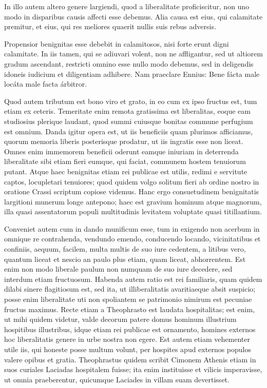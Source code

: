  In illo autem altero genere largiendi, quod a liberalitate proficiscitur, non uno modo in disparibus causis affecti esse debemus. Alia causa est eius, qui calamitate premitur, et eius, qui res meliores quaerit nullis suis rebus adversis.

 Propensior benignitas esse debebit in calamitosos, nisi forte erunt digni calamitate. In iis tamen, qui se adiuvari volent, non ne affligantur, sed ut altiorem gradum ascendant, restricti omnino esse nullo modo debemus, sed in deligendis idoneis iudicium et diligentiam adhibere. Nam praeclare Ennius: Bene fácta male locáta male facta árbitror.

 Quod autem tributum est bono viro et grato, in eo cum ex ipso fructus est, tum etiam ex ceteris. Temeritate enim remota gratissima est liberalitas, eoque eam studiosius plerique laudant, quod summi cuiusque bonitas commune perfugium est omnium. Danda igitur opera est, ut iis beneficiis quam plurimos afficiamus, quorum memoria liberis posterisque prodatur, ut iis ingratis esse non liceat. Omnes enim immemorem beneficii oderunt eamque iniuriam in deterrenda liberalitate sibi etiam fieri eumque, qui faciat, communem hostem tenuiorum putant. Atque haec benignitas etiam rei publicae est utilis, redimi e servitute captos, locupletari tenuiores; quod quidem volgo solitum fieri ab ordine nostro in oratione Crassi scriptum copiose videmus. Hanc ergo consuetudinem benignitatis largitioni munerum longe antepono; haec est gravium hominum atque magnorum, illa quasi assentatorum populi multitudinis levitatem voluptate quasi titillantium.

 Conveniet autem cum in dando munificum esse, tum in exigendo non acerbum in omnique re contrahenda, vendundo emendo, conducendo locando, vicinitatibus et confiniis, aequum, facilem, multa multis de suo iure cedentem, a litibus vero, quantum liceat et nescio an paulo plus etiam, quam liceat, abhorrentem. Est enim non modo liberale paulum non numquam de suo iure decedere, sed interdum etiam fructuosum. Habenda autem ratio est rei familiaris, quam quidem dilabi sinere flagitiosum est, sed ita, ut illiberalitatis avaritiaeque absit suspicio; posse enim liberalitate uti non spoliantem se patrimonio nimirum est pecuniae fructus maximus. Recte etiam a Theophrasto est laudata hospitalitas; est enim, ut mihi quidem videtur, valde decorum patere domus hominum illustrium hospitibus illustribus, idque etiam rei publicae est ornamento, homines externos hoc liberalitatis genere in urbe nostra non egere. Est autem etiam vehementer utile iis, qui honeste posse multum volunt, per hospites apud externos populos valere opibus et gratia. Theophrastus quidem scribit Cimonem Athenis etiam in suos curiales Laciadas hospitalem fuisse; ita enim instituisse et vilicis imperavisse, ut omnia praeberentur, quicumque Laciades in villam suam devertisset.

